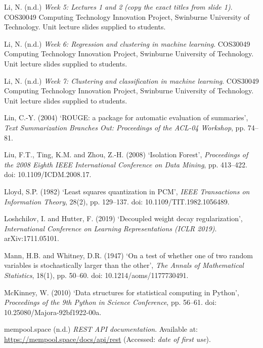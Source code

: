 \begin{references}
\item Li, N. (n.d.) \textit{Week 5: Lectures 1 and 2} \emph{(copy the exact titles from slide 1)}. COS30049 Computing Technology Innovation Project, Swinburne University of Technology. Unit lecture slides supplied to students.

\item Li, N. (n.d.) \textit{Week 6: Regression and clustering in machine learning}. COS30049 Computing Technology Innovation Project, Swinburne University of Technology. Unit lecture slides supplied to students.

\item Li, N. (n.d.) \textit{Week 7: Clustering and classification in machine learning}. COS30049 Computing Technology Innovation Project, Swinburne University of Technology. Unit lecture slides supplied to students.

\item Lin, C.-Y. (2004) ‘ROUGE: a package for automatic evaluation of summaries’, \textit{Text Summarization Branches Out: Proceedings of the ACL-04 Workshop}, pp. 74–81.

\item Liu, F.T., Ting, K.M. and Zhou, Z.-H. (2008) ‘Isolation Forest’, \textit{Proceedings of the 2008 Eighth IEEE International Conference on Data Mining}, pp. 413–422. doi: 10.1109/ICDM.2008.17. \textdaggerdbl

\item Lloyd, S.P. (1982) ‘Least squares quantization in PCM’, \textit{IEEE Transactions on Information Theory}, 28(2), pp. 129–137. doi: 10.1109/TIT.1982.1056489.

\item Loshchilov, I. and Hutter, F. (2019) ‘Decoupled weight decay regularization’, \textit{International Conference on Learning Representations (ICLR 2019)}. arXiv:1711.05101.

\item Mann, H.B. and Whitney, D.R. (1947) ‘On a test of whether one of two random variables is stochastically larger than the other’, \textit{The Annals of Mathematical Statistics}, 18(1), pp. 50–60. doi: 10.1214/aoms/1177730491.

\item McKinney, W. (2010) ‘Data structures for statistical computing in Python’, \textit{Proceedings of the 9th Python in Science Conference}, pp. 56–61. doi: 10.25080/Majora-92bf1922-00a.

\item mempool.space (n.d.) \textit{REST API documentation}. Available at: \url{https://mempool.space/docs/api/rest} (Accessed: \textit{date of first use}).


\end{references}
